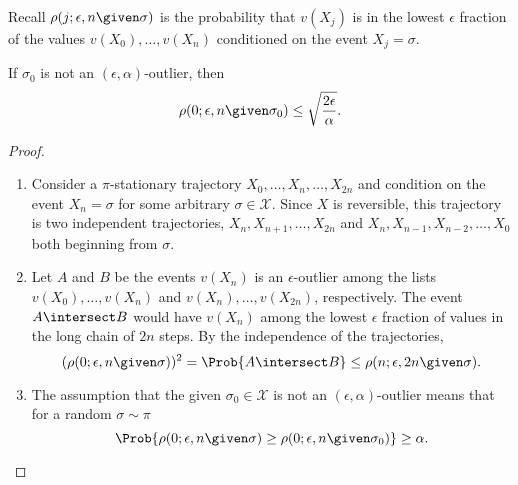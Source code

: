 \documentclass[12pt]{article}
\begin{document}
Recall \( \rho(j; \epsilon, n \given \sigma) \) is the probability that \(
v(X_j) \) is in the lowest \( \epsilon \) fraction of the values \( v(X_0),
\dots, v(X_n) \) conditioned on the event \( X_j = \sigma \).

\begin{lemma}
    If \( \sigma_0 \) is not an \( (\epsilon,\alpha) \)-outlier, then
    \[
        \label{eq:parallelsignificance:nine} \rho(0; \epsilon, n \given
        \sigma_0) \le \sqrt{\frac{2 \epsilon}{\alpha}}.
    \]
\end{lemma}

\begin{proof}
    \begin{enumerate}
        \item
            Consider a \( \pi \)-stationary trajectory \( X_0, \dots, X_n,
            \dots, X_{2n} \) and condition on the event \( X_n = \sigma \)
            for some arbitrary \( \sigma \in \mathcal{X} \).  Since \( X
            \) is reversible, this trajectory is two independent
            trajectories, \( X_n, X_{n+1}, \dots, X_{2n} \) and \( X_n,
            X_{n-1}, X_ {n-2}, \dots, X_0 \) both beginning from \(
            \sigma \).
        \item
            Let \( A \) and \( B \) be the events \( v(X_n) \) is an \(
            \epsilon \)-outlier among the lists \( v(X_0), \dots, v(X_n)
            \) and \( v(X_n), \dots, v(X_{2n}) \), respectively.  The
            event \( A \intersect B \) would have \( v(X_n) \) among the
            lowest \( \epsilon \) fraction of values in the long chain
            of \( 2n \) steps.  By the independence of the trajectories,
            \begin{equation}
                \label{eq:parallelsignificance:eleven} (\rho(0; \epsilon,
                n \given \sigma))^2 = \Prob{ A \intersect B} \le \rho(n;
                \epsilon, 2n \given \sigma).
            \end{equation}
        \item
            The assumption that the given \( \sigma_0 \in \mathcal{X} \)
            is not an \( (\epsilon, \alpha) \)-outlier means that for a
            random \( \sigma \sim \pi \)
            \begin{equation}
                \label{eq:parallelsignificance:twelve} \Prob{ \rho(0;
                \epsilon, n \given \sigma) \ge \rho(0; \epsilon, n
                \given \sigma_0) } \ge \alpha.
            \end{equation}

\end{enumerate}
\end{proof}
\end{document}
